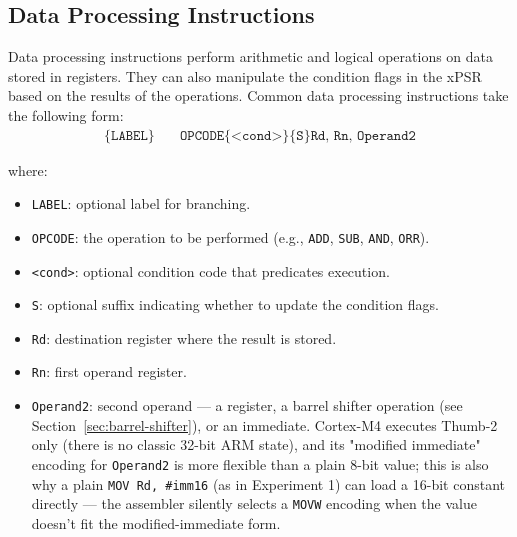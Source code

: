 \subsection{Data Processing Instructions}
Data processing instructions perform arithmetic and logical operations on data stored in registers. They can also manipulate the condition flags in the xPSR based on the results of the operations. Common data processing instructions take the following form:
\[
\begin{aligned}
\texttt{\{LABEL\}} \quad & \texttt{OPCODE\{<cond>\}\{S\} Rd, Rn, Operand2}
\end{aligned}
\]

where:
\begin{itemize}[nosep]
    \item \texttt{LABEL}: optional label for branching.
    \item \texttt{OPCODE}: the operation to be performed (e.g., \texttt{ADD}, \texttt{SUB}, \texttt{AND}, \texttt{ORR}).
    \item \texttt{<cond>}: optional condition code that predicates execution.
    \item \texttt{S}: optional suffix indicating whether to update the condition flags.
    \item \texttt{Rd}: destination register where the result is stored.
    \item \texttt{Rn}: first operand register.
    \item \texttt{Operand2}: second operand — a register, a barrel shifter operation (see Section~\ref{sec:barrel-shifter}), or an immediate. Cortex-M4 executes Thumb-2 only (there is no classic 32-bit ARM state), and its "modified immediate" encoding for \texttt{Operand2} is more flexible than a plain 8-bit value; this is also why a plain \texttt{MOV Rd, \#imm16} (as in Experiment 1) can load a 16-bit constant directly — the assembler silently selects a \texttt{MOVW} encoding when the value doesn't fit the modified-immediate form.
\end{itemize}


